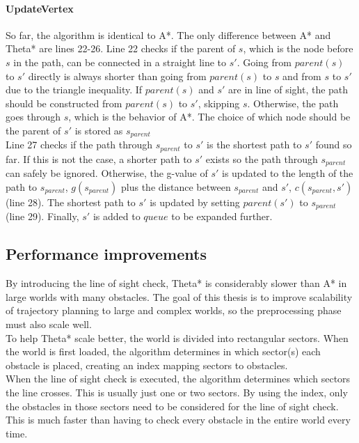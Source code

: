 \paragraph{UpdateVertex}
So far, the algorithm is identical to A*. The only difference between A* and Theta* are lines 22-26. Line 22 checks if the parent of $s$, which is the node before $s$ in the path, can be connected in a straight line to $s'$. Going from $parent(s)$ to $s'$ directly is always shorter than going from $parent(s)$ to $s$ and from $s$ to $s'$ due to the triangle inequality. If $parent(s)$ and $s'$ are in line of sight, the path should be constructed from $parent(s)$ to $s'$, skipping $s$. Otherwise, the path goes through $s$, which is the behavior  of A*. The choice of which node should be the parent of $s'$ is stored as $s_{parent}$\\
Line 27 checks if the path through $s_{parent}$ to $s'$ is the shortest path to $s'$ found so far. If this is not the case, a shorter path to $s'$ exists so the  path through $s_{parent}$ can safely be ignored. Otherwise, the g-value of $s'$ is updated to the length of the path to $s_{parent}$, $g(s_{parent})$ plus the distance between $s_{parent}$ and $s'$, $c(s_{parent},s')$ (line 28). The shortest path to $s'$ is updated by setting $parent(s')$ to $s_{parent}$ (line 29). Finally, $s'$ is added to $queue$ to be expanded further.
\subsection{Performance improvements}
By introducing the line of sight check, Theta* is considerably slower than A* in large worlds with many obstacles. The goal of this thesis is to improve scalability of trajectory planning to large and complex worlds, so the preprocessing phase must also scale well. \\
To help Theta* scale better, the world is divided into rectangular sectors. When the world is first loaded, the algorithm determines in which sector(s) each obstacle is placed, creating an index mapping sectors to obstacles. \\
When the line of sight check is executed, the algorithm determines which sectors the line crosses. This is usually just one or two sectors. By using the index, only the obstacles in those sectors need to be considered for the line of sight check. This is much faster than having to check every obstacle in the entire world every time.



